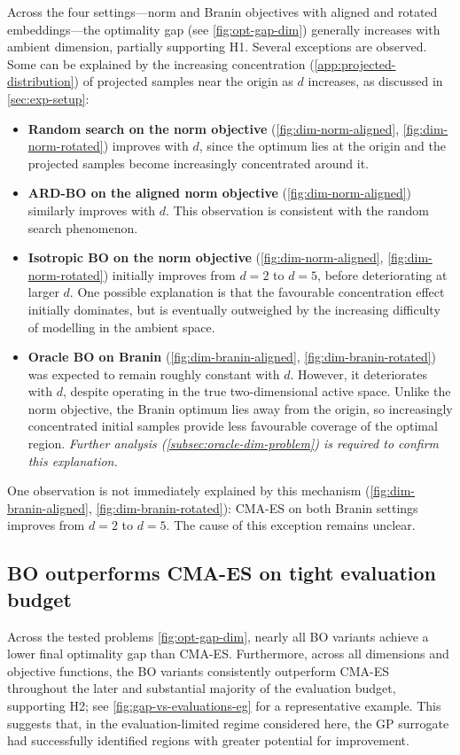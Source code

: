 \documentclass[10pt]{article}
\begin{document}
Across the four settings---norm and Branin objectives with aligned and rotated embeddings---the optimality gap (see \cref{fig:opt-gap-dim}) generally increases with ambient dimension, partially supporting H1. Several exceptions are observed. Some can be explained by the increasing concentration (\cref{app:projected-distribution}) of projected samples near the origin as $d$ increases, as discussed in \cref{sec:exp-setup}:

\begin{itemize}
    \item \textbf{Random search on the norm objective} (\cref{fig:dim-norm-aligned}, \cref{fig:dim-norm-rotated}) improves with $d$, since the optimum lies at the origin and the projected samples become increasingly concentrated around it.

    \item \textbf{ARD-BO on the aligned norm objective} (\cref{fig:dim-norm-aligned}) similarly improves with $d$. This observation is consistent with the random search phenomenon.

    \item \textbf{Isotropic BO on the norm objective} (\cref{fig:dim-norm-aligned}, \cref{fig:dim-norm-rotated}) initially improves from $d=2$ to $d=5$, before deteriorating at larger $d$. One possible explanation is that the favourable concentration effect initially dominates, but is eventually outweighed by the increasing difficulty of modelling in the ambient space.

    \item \textbf{Oracle BO on Branin} (\cref{fig:dim-branin-aligned}, \cref{fig:dim-branin-rotated}) was expected to remain roughly constant with $d$. However, it deteriorates with $d$, despite operating in the true two-dimensional active space. Unlike the norm objective, the Branin optimum lies away from the origin, so increasingly concentrated initial samples provide less favourable coverage of the optimal region. \textit{Further analysis (\cref{subsec:oracle-dim-problem}) is required to confirm this explanation.}
\end{itemize}

One observation is not immediately explained by this mechanism (\cref{fig:dim-branin-aligned}, \cref{fig:dim-branin-rotated}): CMA-ES on both Branin settings improves from $d=2$ to $d=5$. The cause of this exception remains unclear. 


\subsection{BO outperforms CMA-ES on tight evaluation budget}
Across the tested problems \cref{fig:opt-gap-dim}, nearly all BO variants achieve a lower final optimality gap than CMA-ES. Furthermore, across all dimensions and objective functions, the BO variants consistently outperform CMA-ES throughout the later and substantial majority of the evaluation budget, supporting H2; see \cref{fig:gap-vs-evaluations-eg} for a representative example. This suggests that, in the evaluation-limited regime considered here, the GP surrogate had successfully identified regions with greater potential for improvement.
\end{document}

